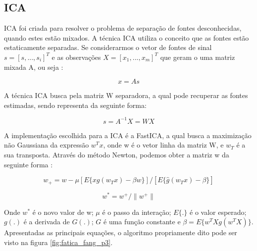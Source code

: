 % 

\subsection{ICA}

ICA foi criada para resolver o problema de separação de fontes desconhecidas, quando estes estão mixados. A técnica ICA utiliza o conceito
que as fontes estão estaticamente separadas. Se considerarmos o vetor de fontes de sinal $s=[s,...,s_i]^T$ e as observações
$X = [x_1,...,x_m]^T$ que geram o uma matriz mixada A, ou seja \cite{Duan2017}:

\begin{equation}\label{eq:ica_1}
    x = As
\end{equation}

A técnica ICA busca pela matriz W separadora, a qual pode recuperar as fontes estimadas, sendo representa da seguinte forma: 

\begin{equation}\label{eq:ica_2}
    s = A^{-1}X = WX
\end{equation}

A implementação escolhida para a ICA é a FastICA, a qual busca a maximização não Gaussiana da expressão $w^Tx$, onde w é o vetor linha
da matriz W, e $w_T$ é a sua transposta. Através do método Newton, podemos obter a matriz w da seguinte forma \cite{Duan2017}:

\begin{equation}\label{eq:ica_3}
    w_+ = w - \mu[E\{xg(w_Tx)-\beta w\}] /[E\{\hat{g}(w_Tx)-\beta\}]
\end{equation}

\begin{equation}\label{eq:ica_4}
    w^* = w^+/\parallel w^+\parallel
\end{equation}

Onde $w^*$ é o novo valor de w; $\mu$ é o passo da interação; $E\{.\}$ é o valor esperado; $g(.)$ é a derivada de $G(.)$; $G$ é uma
função constante e $\beta = E\{w^T Xg(w^T X)\}$.
Apresentadas as principais equações, o algoritmo propriamente dito pode ser visto na figura \ref{fig:fatica_fang_p3}.

